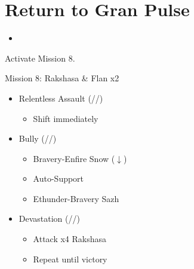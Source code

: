 \chapter{Return to Gran Pulse}

\begin{menu}
	\begin{itemize}
		\paradigm
		\begin{itemize}
			\item {}%
				{\paradigmline{\com}{\com}{\com}}%
				{\paradigmline{\com}{(\sab)}{\com}}%
				{\paradigmline[4]{\com}{\rav}{\rav}}%
				{\paradigmline{\syn}{\sab}{\com}}%
				{\paradigmline{\rav}{\med}{\rav}}%
				{\paradigmline{\rav}{\rav}{\rav}}%
		\end{itemize}
	\end{itemize}
\end{menu}

\renewcommand{\first}{[1] Cerberus (\com/\com/\com)}
\renewcommand{\second}{[2] Devastation (\com/\sab/\com)}
\renewcommand{\third}{[3] Relentless Assault (\com/\rav/\rav)}
\renewcommand{\fourth}{[4] Bully (\syn/\sab/\com)}
\renewcommand{\fifth}{[5] Thaumaturgy (\rav/\med/\rav)}
\renewcommand{\sixth}{[6] Tri-Disaster (\rav/\rav/\rav)}

Activate Mission 8.

\begin{battle}{Mission 8: Rakshasa \& Flan x2}
	\begin{itemize}
		\item \third
			\begin{itemize}
				\item Shift immediately
			\end{itemize}
		\item \fourth
			\begin{itemize}
				\item Bravery-Enfire Snow ($\downarrow$)
				\item Auto-Support
				\item Ethunder-Bravery Sazh
			\end{itemize}
		\item \second
			\begin{itemize}
				\item Attack x4 Rakshasa
				\item Repeat until victory
			\end{itemize}
	\end{itemize}
\end{battle}

